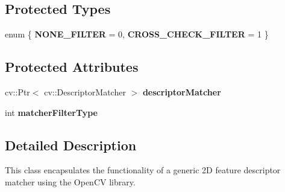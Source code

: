 \subsection*{Protected Types}
\begin{DoxyCompactItemize}
\item 
enum \{ {\bfseries NONE\_\-FILTER} =  0, 
{\bfseries CROSS\_\-CHECK\_\-FILTER} =  1
 \}
\end{DoxyCompactItemize}
\subsection*{Protected Attributes}
\begin{DoxyCompactItemize}
\item 
\hypertarget{class_visual_feature_matcher___generic_af342f1e9d8e90dfcb7ad3f3fea7133cf}{
cv::Ptr$<$ cv::DescriptorMatcher $>$ {\bfseries descriptorMatcher}}
\label{class_visual_feature_matcher___generic_af342f1e9d8e90dfcb7ad3f3fea7133cf}

\item 
\hypertarget{class_visual_feature_matcher___generic_a00f0156439c360533af21f05226f4fd4}{
int {\bfseries matcherFilterType}}
\label{class_visual_feature_matcher___generic_a00f0156439c360533af21f05226f4fd4}

\end{DoxyCompactItemize}


\subsection{Detailed Description}
This class encapsulates the functionality of a generic 2D feature descriptor matcher using the OpenCV library. 

